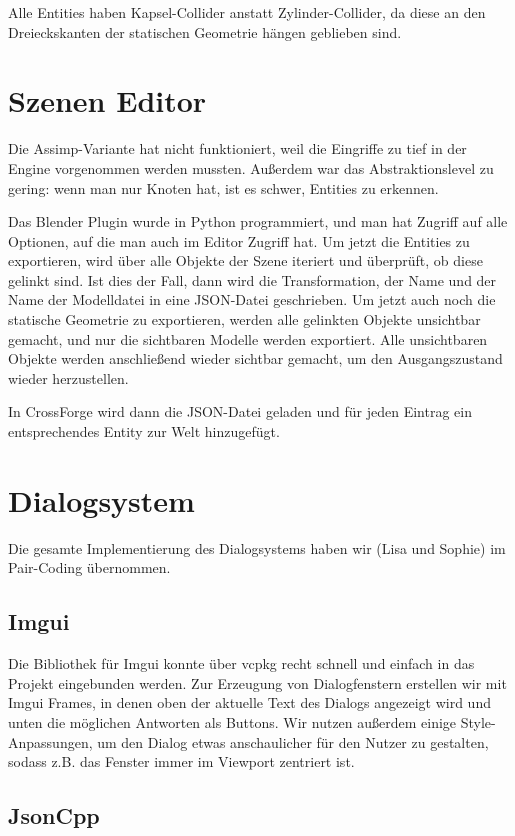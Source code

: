 Alle Entities haben Kapsel-Collider anstatt Zylinder-Collider, da diese an den Dreieckskanten der statischen Geometrie hängen geblieben sind.

\section{Szenen Editor}

Die Assimp-Variante hat nicht funktioniert, weil die Eingriffe zu tief in der Engine vorgenommen werden mussten. Außerdem war das Abstraktionslevel zu gering: wenn man nur Knoten hat, ist es schwer, Entities zu erkennen.

Das Blender Plugin wurde in Python programmiert, und man hat Zugriff auf alle Optionen, auf die man auch im Editor Zugriff hat. Um jetzt die Entities zu exportieren, wird über alle Objekte der Szene iteriert und überprüft, ob diese gelinkt sind. Ist dies der Fall, dann wird die Transformation, der Name und der Name der Modelldatei in eine JSON-Datei geschrieben. Um jetzt auch noch die statische Geometrie zu exportieren, werden alle gelinkten Objekte unsichtbar gemacht, und nur die sichtbaren Modelle werden exportiert. Alle unsichtbaren Objekte werden anschließend wieder sichtbar gemacht, um den Ausgangszustand wieder herzustellen.

In CrossForge wird dann die JSON-Datei geladen und für jeden Eintrag ein entsprechendes Entity zur Welt hinzugefügt.

\section{Dialogsystem}

Die gesamte Implementierung des Dialogsystems haben wir (Lisa und Sophie) im Pair-Coding übernommen. 

\subsection{Imgui}

Die Bibliothek für Imgui konnte über vcpkg recht schnell und einfach in das Projekt eingebunden werden. Zur Erzeugung von Dialogfenstern erstellen wir mit Imgui Frames, in denen oben der aktuelle Text des Dialogs angezeigt wird und unten die möglichen Antworten als Buttons. Wir nutzen außerdem einige Style-Anpassungen, um den Dialog etwas anschaulicher für den Nutzer zu gestalten, sodass z.B. das Fenster immer im Viewport zentriert ist.

\subsection{JsonCpp}

